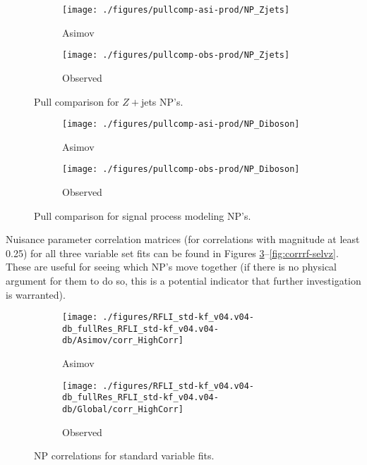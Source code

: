 \begin{figure}[!htbp]\captionsetup{justification=centering}\begin{subfigure}[t]{0.490000\textwidth}\centering\texttt{[image: ./figures/pullcomp-asi-prod/NP\_Zjets]}\caption{Asimov}\end{subfigure}
\begin{subfigure}[t]{0.490000\textwidth}\centering\texttt{[image: ./figures/pullcomp-obs-prod/NP\_Zjets]}\caption{Observed}\end{subfigure}
  \caption{Pull comparison for $Z+$jets NP's.}
  \label{fig:PullComparisons-Zjetsvz}
\end{figure}

\begin{figure}[!htbp]\captionsetup{justification=centering}\begin{subfigure}[t]{0.490000\textwidth}\centering\texttt{[image: ./figures/pullcomp-asi-prod/NP\_Diboson]}\caption{Asimov}\end{subfigure}
\begin{subfigure}[t]{0.490000\textwidth}\centering\texttt{[image: ./figures/pullcomp-obs-prod/NP\_Diboson]}\caption{Observed}\end{subfigure}
  \caption{Pull comparison for signal process modeling NP's.}
  \label{fig:PullComparisons-Dibosonvz}
\end{figure}

Nuisance parameter correlation matrices (for correlations with magnitude at least 0.25) for all three variable set fits can be found in Figures \ref{fig:corrstd-kfvz}--\ref{fig:corrrf-selvz}.  These are useful for seeing which NP's move together (if there is no physical argument for them to do so, this is a potential indicator that further investigation is warranted).

\begin{figure}[!htbp]\captionsetup{justification=centering}
\begin{subfigure}[t]{0.49000\textwidth}\centering\texttt{[image: ./figures/RFLI\_std-kf\_v04.v04-db\_fullRes\_RFLI\_std-kf\_v04.v04-db/Asimov/corr\_HighCorr]}\caption{Asimov}\end{subfigure}
\begin{subfigure}[t]{0.49000\textwidth}\centering\texttt{[image: ./figures/RFLI\_std-kf\_v04.v04-db\_fullRes\_RFLI\_std-kf\_v04.v04-db/Global/corr\_HighCorr]}\caption{Observed}\end{subfigure}
  \caption{NP correlations for standard variable fits.}
  \label{fig:corrstd-kfvz}
\end{figure}


